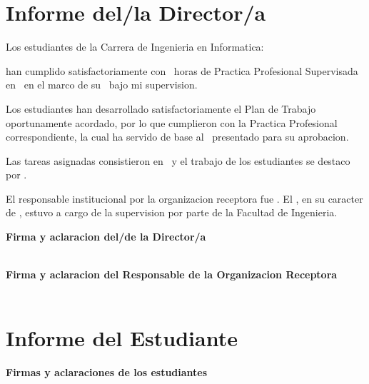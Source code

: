 \section*{Informe del/la Director/a}

Los estudiantes de la Carrera de Ingenieria en Informatica:
\begin{itemize}
\studentsList
\end{itemize}
han cumplido satisfactoriamente con \hoursPPS\ horas de Practica Profesional Supervisada en
\organizationPlace\ en el marco de su \workType\ bajo mi supervision.
\vspace{0.25cm}

Los estudiantes han desarrollado satisfactoriamente el Plan de Trabajo oportunamente
acordado, por lo que cumplieron con la Practica Profesional correspondiente, la cual ha
servido de base al \workType\ presentado para su aprobacion.
\vspace{0.25cm}

Las tareas asignadas consistieron en \tasksDescription\ y el trabajo de los
estudiantes se destaco por \performanceHighlights.
\vspace{0.25cm}

El responsable institucional por la organizacion receptora fue \institutionalResponsible.
El \fiubaDirectorName, en su caracter de \fiubaDirectorRole, estuvo a cargo de la
supervision por parte de la Facultad de Ingenieria.
\vspace{0.25cm}

\bigskip
\textbf{Firma y aclaracion del/de la Director/a}\\
\signatureBoxCentered{\directorSignatureImage}{\directorSignatureWidth}{\directorSignatureHeight}\\
\directorName

\bigskip
\textbf{Firma y aclaracion del Responsable de la Organizacion Receptora}\\
\signatureBoxCentered{\organizationSignatureImage}{\organizationSignatureWidth}{\organizationSignatureHeight}\\
\organizationResponsibleName

\newpage
\section*{Informe del Estudiante}

\studentOpinion

\bigskip
\textbf{Firmas y aclaraciones de los estudiantes}

